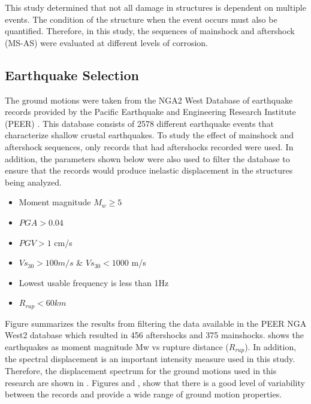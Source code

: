 This study determined that not all damage in structures is dependent on multiple events. The condition of the structure when the event occurs must also be quantified. Therefore, in this study, the sequences of mainshock and aftershock (MS-AS) were evaluated at different levels of corrosion.

\subsection{Earthquake Selection}

The ground motions were taken from the NGA2 West Database of earthquake records provided by the Pacific Earthquake and Engineering Research Institute (PEER) \cite{Ancheta2014}. This database consists of 2578 different earthquake events that characterize shallow crustal earthquakes. To study the effect of mainshock and aftershock sequences, only records that had aftershocks recorded were used. In addition, the parameters shown below were also used to filter the database to ensure that the records would produce inelastic displacement in the structures being analyzed.

\begin{itemize}
	\item Moment magnitude $M_w \geqslant 5$
	\item $PGA>0.04$
	\item $PGV>1$ cm/s
	\item $Vs_{30}>100m/s$ \& $Vs_{30}<1000$ m/s
	\item Lowest usable frequency is less than 1Hz
	\item $R_{rup}<60km$
\end{itemize}

Figure  summarizes the results from filtering the data available in the PEER NGA West2 database which resulted in 456 aftershocks and 375 mainshocks.  shows the earthquakes as moment magnitude {Mw} vs rupture distance ($R_{rup}$). In addition, the spectral displacement is an important intensity measure used in this study. Therefore, the displacement spectrum for the ground motions used in this research are shown in . Figures  and , show that there is a good level of variability between the records and provide a wide range of ground motion properties. 

